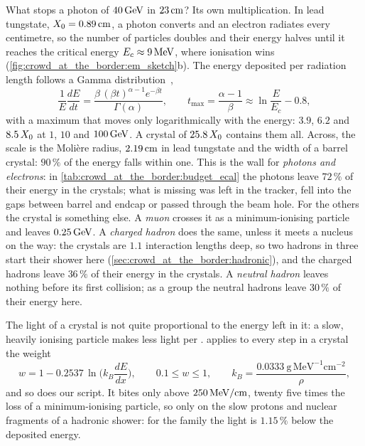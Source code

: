 What stops a photon of $40\,\mathrm{GeV}$ in $23\,\mathrm{cm}$? Its own multiplication. In
lead tungstate, $X_0=0.89\,\mathrm{cm}$, a photon converts and an electron radiates
every centimetre, so the number of particles doubles and their energy
halves until it reaches the critical energy $E_c\approx9\,\mathrm{MeV}$, where
ionisation wins (\cref{fig:crowd_at_the_border:em_sketch}b). The energy
deposited per radiation length follows a Gamma
distribution~\cite{Grindhammer:1993kw},
\begin{equation}
  \frac{1}{E}\frac{dE}{dt}=\frac{\beta\,(\beta t)^{\alpha-1}e^{-\beta t}}{\Gamma(\alpha)},
  \qquad t_{\max}=\frac{\alpha-1}{\beta}\approx\ln\frac{E}{E_c}-0.8 ,
  \label{eq:crowd_at_the_border:gamma}
\end{equation}
with a maximum that moves only logarithmically with the energy: $3.9$,
$6.2$ and $8.5\,X_0$ at $1$, $10$ and $100\,\mathrm{GeV}$. A crystal of $25.8\,X_0$
contains them all. Across, the scale is the Moli\`ere radius, $2.19\,\mathrm{cm}$ in
lead tungstate and the width of a barrel crystal: $90\,\%$ of the energy
falls within one. This is the wall for \emph{photons and electrons}: in
\cref{tab:crowd_at_the_border:budget_ecal} the photons leave
$72\,\%$
of their energy in the crystals; what is missing was left in the tracker,
fell into the gaps between barrel and endcap or passed through the beam
hole. For the others the crystal is something else. A \emph{muon} crosses
it as a minimum-ionising particle and leaves $0.25\,\mathrm{GeV}$. A \emph{charged
hadron} does the same, unless it meets a nucleus on the way: the crystals
are $1.1$ interaction lengths deep, so two hadrons in three start their
shower here (\cref{sec:crowd_at_the_border:hadronic}), and the charged
hadrons leave $36\,\%$
of their energy in the crystals. A \emph{neutral hadron} leaves nothing
before its first collision; as a group the neutral hadrons leave
$30\,\%$
of their energy here.

The light of a crystal is not quite proportional to the energy left in it:
a slow, heavily ionising particle makes less light per \MeV. \CMSSW applies
to every step in a crystal the weight
\begin{equation}
  w = 1-0.2537\,\ln\!\Big(k_B\frac{dE}{dx}\Big),\qquad 0.1\le w\le1,\qquad k_B=\frac{0.0333\ \mathrm{g\,MeV^{-1}cm^{-2}}}{\rho} ,
  \label{eq:crowd_at_the_border:birks_ecal}
\end{equation}
and so does our script. It bites only above $250\,\mathrm{MeV}/\mathrm{cm}$, twenty
five times the loss of a minimum-ionising particle, so only on the slow
protons and nuclear fragments of a hadronic shower: for the family the
light is $1.15\,\%$
below the deposited energy.

